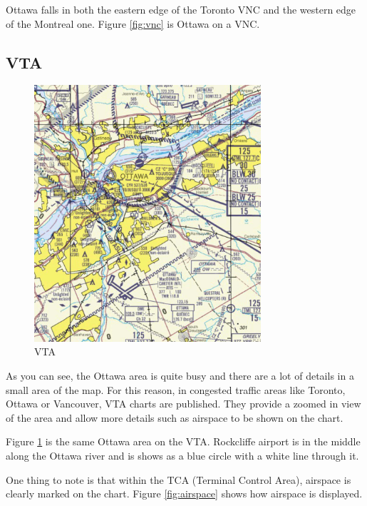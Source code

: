 \documentclass[12pt,letterpaper]{article}
\begin{document}
        Ottawa falls in both the eastern edge of the Toronto VNC and the western edge of the Montreal one. Figure \ref{fig:vnc} is Ottawa on a VNC.
        
        \subsection{VTA}
        \begin{figure}[H]
            \centering
            \includegraphics[width=0.75\textwidth]{vta.jpeg}
            \caption{VTA}
            \label{fig:vta}
        \end{figure}
        
        As you can see, the Ottawa area is quite busy and there are a lot of details in a small area of the map. For this reason, in congested traffic areas like Toronto, Ottawa or Vancouver, VTA charts are published. They provide a zoomed in view of the area and allow more details such as airspace to be shown on the chart.
        
        Figure \ref{fig:vta} is the same Ottawa area on the VTA. Rockcliffe airport is in the middle along the Ottawa river and is shows as a blue circle with a white line through it.
        
        One thing to note is that within the TCA (Terminal Control Area), airspace is clearly marked on the chart. Figure \ref{fig:airspace} shows how airspace is displayed. 
        
\end{document}
